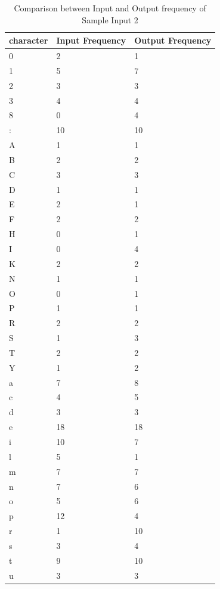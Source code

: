 \begin{table}[H]
\centering
\begin{tabular}{|p{2cm}|p{2cm}|p{2cm}|}
\hline
character & Input Frequency & Output Frequency \\
\hline
0 & 2 & 1\\
\hline
1 & 5 & 7\\
\hline
2 & 3 & 3\\
\hline
3 & 4 & 4\\
\hline
8 & 0 & 4\\
\hline
: & 10 & 10\\
\hline
A & 1 & 1\\
\hline
B & 2 & 2\\
\hline
C & 3 & 3\\
\hline
D & 1 & 1\\
\hline
E & 2 & 1\\
\hline
F & 2 & 2\\
\hline
H & 0 & 1\\
\hline
I & 0 & 4\\
\hline
K & 2 & 2\\
\hline
N & 1 & 1\\
\hline
O & 0 & 1\\
\hline
P & 1 & 1\\
\hline
R & 2 & 2\\
\hline
S & 1 & 3\\
\hline
T & 2 & 2\\
\hline
Y & 1 & 2\\
\hline
a & 7 & 8\\
\hline
c & 4 & 5\\
\hline
d & 3 & 3\\
\hline
e & 18 & 18\\
\hline
i & 10 & 7\\
\hline
l & 5 & 1\\
\hline
m & 7 & 7\\
\hline
n & 7 & 6\\
\hline
o & 5 & 6\\
\hline
p & 12 & 4\\
\hline
r & 1 & 10\\
\hline
s & 3 & 4\\
\hline
t & 9 & 10\\
\hline
u & 3 & 3\\
\hline
\end{tabular}
\caption {Comparison between Input and Output frequency of Sample Input 2}
\label {tab:Table2}
\end{table}

